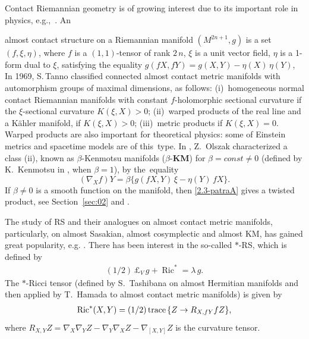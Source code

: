 \documentclass[11pt,a4paper,twoside]{article}
\def\Ric{\operatorname{Ric}}
\def\tr{{\rm\,trace\,}}
\begin{document}
Contact Riemannian geometry is of growing interest due to its important role in physics, e.g.,~\cite{blair2010riemannian}.
An~{almost contact structure on a Riemannian manifold $(M^{2n+1},g)$ is a set $(f,\xi,\eta)$, where
${f}$ is a $(1,1)$-tensor of rank $2\,n$, $\xi$ is a unit vector field, ${\eta}$ is a 1-form dual to $\xi$, satisfying the equality
$g({f} X,{f} Y)= g(X,Y) - {\eta}(X)\,{\eta}(Y)$,
In 1969, S.\,Tanno classified connected almost contact metric mani\-folds with automorphism groups of maximal dimensions, as follows:
(i)~homogeneous normal contact Riemannian manifolds with constant $f$-holomorphic sectional curvature if the $\xi$-sectional curvature $K(\xi, X) > 0$;
(ii)~warped products of the real line and a K\"{a}hler manifold, if $K(\xi, X)>0$;
(iii)~metric products if $K(\xi, X)=0$.
%
Warped products are also important for  theoretical physics: some of Einstein metrics and spacetime models are of this~type.
%
In \cite{olszak1991normal}, Z.~Olszak cha\-racterized a class (ii), known as $\beta$-Kenmotsu manifolds ($\beta$-\textbf{KM}) for $\beta=const\ne0$
(defined by K.~Kenmotsu in \cite{kenmotsu1972class}, when $\beta=1$), by the~equality
\begin{equation}\label{2.3-patraA}
 (\nabla_{X} f)Y=\beta\{g(f X, Y)\,\xi -\eta(Y)\,f X\} .
\end{equation}
If $\beta\ne0$ is a smooth function on the manifold, then \eqref{2.3-patraA} gives a twisted product, see Section~\ref{sec:02} and \cite{rov-119}.

\smallskip

The study of RS and their analogues on almost contact metric manifolds,
particularly, on almost Sasakian, almost cosymplectic and almost KM, has gained great popularity,
e.g. \cite{Gosh-Patra2018,kenmotsu1972class,Li-2022,Mondal-2024,Patra-2024,ven-2019}.
%
There has been interest in the so-called $\ast$-RS, which is defined by
\begin{align*}
 (1/2)\,\pounds_V\,g + \Ric^\ast = \lambda\,g .
\end{align*}
The $\ast$-Ricci tensor (defined by S.~Tashibana \cite{Tash-1959} on almost Hermitian manifolds and then applied by T.~Hamada \cite{Hamada-2002} to almost contact metric manifolds) is given by
\begin{align}\label{E-ast-Ricci-tensor}
 \Ric^\ast(X,Y) = (1/2)\tr\{Z\to R_{X, fY} fZ\} ,
\end{align}
where
$R_{{X},{Y}}Z=\nabla_X\nabla_Y Z-\nabla_Y\nabla_X Z-\nabla_{[X,Y]} Z$ is the curvature tensor.

}
\end{document}
